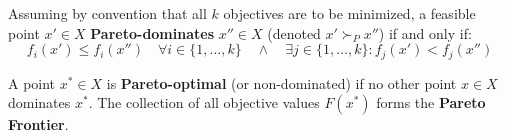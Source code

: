\begin{definition}
Assuming by convention that all $k$ objectives are to be minimized, a feasible point $x' \in X$ \textbf{Pareto-dominates} $x'' \in X$ (denoted $x' \succ_P x''$) if and only if:
\begin{equation}
f_i(x') \le f_i(x'') \quad \forall i \in \{1, \dots, k\} \quad \land \quad \exists j \in \{1, \dots, k\} : f_j(x') < f_j(x'')
\end{equation}
\end{definition}

\begin{definition}
A point $x^* \in X$ is \textbf{Pareto-optimal} (or non-dominated) if no other point $x \in X$ dominates $x^*$. The collection of all objective values $F(x^*)$ forms the \textbf{Pareto Frontier}.
\end{definition}

